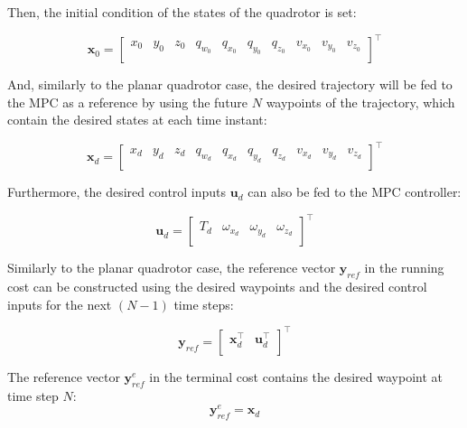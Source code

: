 \documentclass{thesisreport}
\begin{document}
Then, the initial condition of the states of the quadrotor is set:

\begin{equation}
	\bm{x}_0 = \begin{bmatrix}
		x_0 & y_0 & z_0 & q_{w_0} & q_{x_0} & q_{y_0} & q_{z_0} & v_{x_0} & v_{y_0} & v_{z_0}\\
	\end{bmatrix}^{\intercal}
\end{equation}

And, similarly to the planar quadrotor case, the desired trajectory will be fed to the MPC as a reference by using the future $N$ waypoints of the trajectory, which contain the desired states at each time instant:

\begin{equation}
	\bm{x}_d = \begin{bmatrix}
		x_d & y_d & z_d & q_{w_d} & q_{x_d} & q_{y_d} & q_{z_d} & v_{x_d} & v_{y_d} & v_{z_d}\\
	\end{bmatrix}^{\intercal}
\end{equation}







Furthermore, the desired control inputs $\bm{u}_d$ can also be fed to the MPC controller:


\begin{equation}
	\bm{u}_d = \begin{bmatrix}
		T_d & \omega_{x_d} & \omega_{y_d} & \omega_{z_d} \\
	\end{bmatrix}^{\intercal}
\end{equation}

 Similarly to the planar quadrotor case, the reference vector $\bm{y}_{ref}$ in the running cost can be constructed using the desired waypoints and the desired control inputs for the next $(N-1)$ time steps:

\begin{equation}
	\bm{y}_{ref} = \begin{bmatrix}
		\bm{x}_d^{\intercal} & \bm{u}_d^{\intercal} \\
	\end{bmatrix}^{\intercal}
\end{equation}

The reference vector $\bm{y}_{ref}^e$ in the terminal cost contains the desired waypoint at time step $N$:
\begin{equation}
	\bm{y}_{ref}^e = \bm{x}_d
\end{equation}
\end{document}
